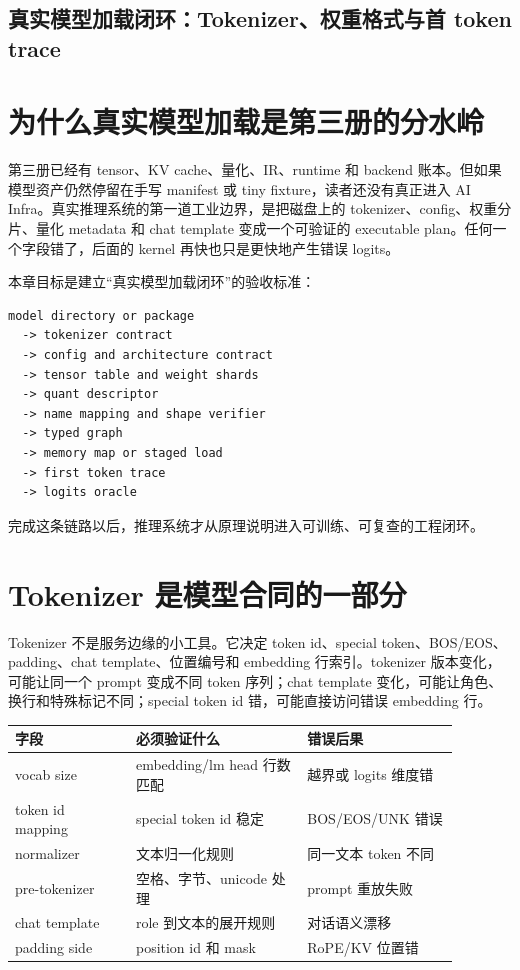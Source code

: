 \subsection*{真实模型加载闭环：Tokenizer、权重格式与首 token trace}

\section{为什么真实模型加载是第三册的分水岭}

第三册已经有 tensor、KV cache、量化、IR、runtime 和 backend 账本。但如果模型资产仍然停留在手写 manifest 或 tiny fixture，读者还没有真正进入 AI Infra。真实推理系统的第一道工业边界，是把磁盘上的 tokenizer、config、权重分片、量化 metadata 和 chat template 变成一个可验证的 executable plan。任何一个字段错了，后面的 kernel 再快也只是更快地产生错误 logits。

本章目标是建立“真实模型加载闭环”的验收标准：

\begin{lstlisting}[numbers=none,caption={真实模型加载闭环}]
model directory or package
  -> tokenizer contract
  -> config and architecture contract
  -> tensor table and weight shards
  -> quant descriptor
  -> name mapping and shape verifier
  -> typed graph
  -> memory map or staged load
  -> first token trace
  -> logits oracle
\end{lstlisting}

完成这条链路以后，推理系统才从原理说明进入可训练、可复查的工程闭环。

\section{Tokenizer 是模型合同的一部分}

Tokenizer 不是服务边缘的小工具。它决定 token id、special token、BOS/EOS、padding、chat template、位置编号和 embedding 行索引。tokenizer 版本变化，可能让同一个 prompt 变成不同 token 序列；chat template 变化，可能让角色、换行和特殊标记不同；special token id 错，可能直接访问错误 embedding 行。

\begin{center}
\small
\begin{tabular}{p{0.24\linewidth}p{0.34\linewidth}p{0.30\linewidth}}
\toprule
字段 & 必须验证什么 & 错误后果 \\
\midrule
vocab size & embedding/lm head 行数匹配 & 越界或 logits 维度错 \\
token id mapping & special token id 稳定 & BOS/EOS/UNK 错误 \\
normalizer & 文本归一化规则 & 同一文本 token 不同 \\
pre-tokenizer & 空格、字节、unicode 处理 & prompt 重放失败 \\
chat template & role 到文本的展开规则 & 对话语义漂移 \\
padding side & position id 和 mask & RoPE/KV 位置错 \\
\bottomrule
\end{tabular}
\end{center}


